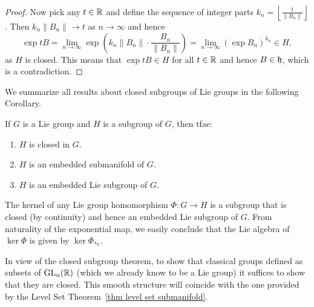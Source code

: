 \begin{proof}
    Now pick any $t\in \mathbb{R}$ and define the sequence of integer parts $k_n=\left\lfloor\frac{t}{\lVert B_n\rVert}\right\rfloor$. Then $k_n\lVert B_n\rVert\to t$ as $n\to\infty$ and hence
    \[\exp tB=\lim_{n\to \infty}\exp\left(k_n\lVert B_n\rVert\cdot \frac{B_n}{\lVert B_n\rVert}\right)=\lim_{n\to\infty}\left(\exp B_n\right)^{k_n}\in H,\]
    as $H$ is closed. This means that $\exp tB\in H$ for all $t\in\mathbb{R}$ and hence $B\in\mathfrak{h}$, which is a contradiction.
\end{proof}

We summarize all results about closed subgroups of Lie groups in the following Corollary.

\begin{cor}
    If $G$ is a Lie group and $H$ is a subgroup of $G$, then \gls{tfae}:
    \begin{enumerate}
        \item $H$ is closed in $G$.
        \item $H$ is an embedded submanifold of $G$.
        \item $H$ is an embedded Lie subgroup of $G$.
    \end{enumerate}
\end{cor}

\begin{example}\label{example kernel Lie subgroup}
    The kernel of any Lie group homomorphism $\Phi:G\to H$ is a subgroup that is closed (by continuity) and hence an embedded Lie subgroup of $G$. From naturality of the exponential map, we easily conclude that the Lie algebra of $\ker \Phi$ is given by $\ker \Phi_{\ast e}$.
\end{example}

\begin{example}
    In view of the closed subgroup theorem, to show that classical groups defined as subsets of $\operatorname{GL}_n(\mathbb{R})$ (which we already know to be a Lie group) it suffices to show that they are closed. This smooth structure will coincide with the one provided by the Level Set Theorem~\ref{thm level set submanifold}.
\end{example}


